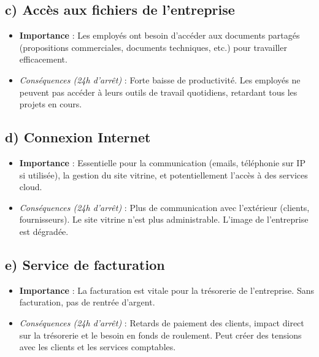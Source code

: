 \documentclass[a4paper,10pt]{article}
\newcommand{\notion}[1]{\textbf{\textcolor{mainBlue}{#1}}}
\newcommand{\important}[1]{\textit{\textcolor{alertRed}{#1}}}
\begin{document}
\begin{tcolorbox}[title=1) Identifier les activités critiques]
    \subsection*{c) Accès aux fichiers de l'entreprise}
    \begin{itemize}[leftmargin=*]
        \item \notion{Importance} : Les employés ont besoin d'accéder aux documents partagés (propositions commerciales, documents techniques, etc.) pour travailler efficacement.
        \item \important{Conséquences (24h d'arrêt)} : Forte baisse de productivité. Les employés ne peuvent pas accéder à leurs outils de travail quotidiens, retardant tous les projets en cours.
    \end{itemize}
    
    \subsection*{d) Connexion Internet}
    \begin{itemize}[leftmargin=*]
        \item \notion{Importance} : Essentielle pour la communication (emails, téléphonie sur IP si utilisée), la gestion du site vitrine, et potentiellement l'accès à des services cloud.
        \item \important{Conséquences (24h d'arrêt)} : Plus de communication avec l'extérieur (clients, fournisseurs). Le site vitrine n'est plus administrable. L'image de l'entreprise est dégradée.
    \end{itemize}

    \subsection*{e) Service de facturation}
    \begin{itemize}[leftmargin=*]
        \item \notion{Importance} : La facturation est vitale pour la trésorerie de l'entreprise. Sans facturation, pas de rentrée d'argent.
        \item \important{Conséquences (24h d'arrêt)} : Retards de paiement des clients, impact direct sur la trésorerie et le besoin en fonds de roulement. Peut créer des tensions avec les clients et les services comptables.
    \end{itemize}
\end{tcolorbox}
\end{document}
